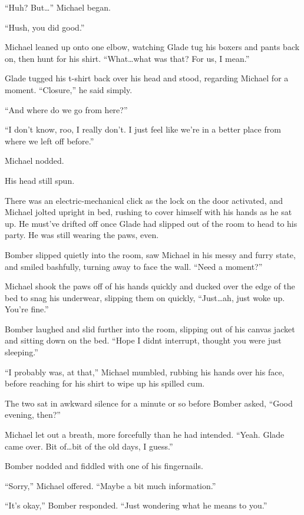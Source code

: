``Huh? But\ldots{}'' Michael began.

``Hush, you did good.''

Michael leaned up onto one elbow, watching Glade tug his boxers and pants back on, then hunt for his shirt. ``What\ldots{}what was that? For us, I mean.''

Glade tugged his t-shirt back over his head and stood, regarding Michael for a moment. ``Closure,'' he said simply.

``And where do we go from here?''

``I don't know, roo, I really don't. I just feel like we're in a better place from where we left off before.''

Michael nodded.

His head still spun.

\secdiv{}

There was an electric-mechanical click as the lock on the door activated, and Michael jolted upright in bed, rushing to cover himself with his hands as he sat up. He must've drifted off once Glade had slipped out of the room to head to his party. He was still wearing the paws, even.

Bomber slipped quietly into the room, saw Michael in his messy and furry state, and smiled bashfully, turning away to face the wall. ``Need a moment?''

Michael shook the paws off of his hands quickly and ducked over the edge of the bed to snag his underwear, slipping them on quickly, ``Just\ldots{}ah, just woke up. You're fine.''

Bomber laughed and slid further into the room, slipping out of his canvas jacket and sitting down on the bed. ``Hope I didnt interrupt, thought you were just sleeping.''

``I probably was, at that,'' Michael mumbled, rubbing his hands over his face, before reaching for his shirt to wipe up his spilled cum.

The two sat in awkward silence for a minute or so before Bomber asked, ``Good evening, then?''

Michael let out a breath, more forcefully than he had intended. ``Yeah. Glade came over. Bit of\ldots{}bit of the old days, I guess.''

Bomber nodded and fiddled with one of his fingernails.

``Sorry,'' Michael offered. ``Maybe a bit much information.''

``It's okay,'' Bomber responded. ``Just wondering what he means to you.''

